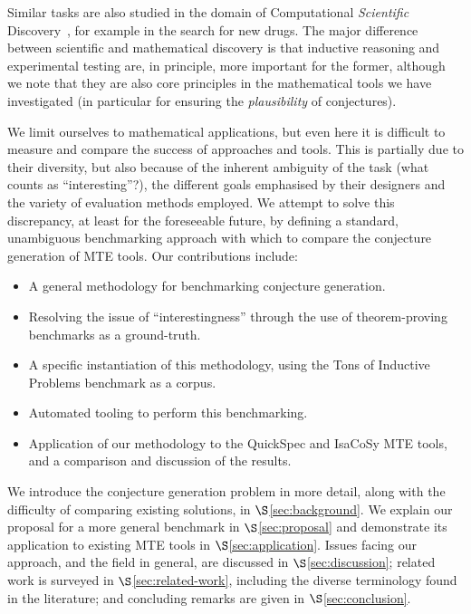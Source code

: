 Similar tasks are also studied in the domain of Computational \emph{Scientific}
Discovery~\cite{king2004functional,Williams20141289,schmidt2009distilling}, for
example in the search for new drugs. The major difference between scientific and
mathematical discovery is that inductive reasoning and experimental testing are,
in principle, more important for the former, although we note that they are also
core principles in the mathematical tools we have investigated (in particular
for ensuring the \emph{plausibility} of conjectures).

We limit ourselves to mathematical applications, but even here it is difficult
to measure and compare the success of approaches and tools. This is partially
due to their diversity, but also because of the inherent ambiguity of the task
(what counts as ``interesting''?), the different goals emphasised by their
designers and the variety of evaluation methods employed. We attempt to solve
this discrepancy, at least for the foreseeable future, by defining a standard,
unambiguous benchmarking approach with which to compare the conjecture
generation of MTE tools. Our contributions include:

\begin{itemize}
\item A general methodology for benchmarking conjecture generation.
\item Resolving the issue of ``interestingness'' through the use of
  theorem-proving benchmarks as a ground-truth.
\item A specific instantiation of this methodology, using the Tons of Inductive
  Problems benchmark as a corpus.
\item Automated tooling to perform this benchmarking.
\item Application of our methodology to the QuickSpec and IsaCoSy MTE tools,
  and a comparison and discussion of the results.
\end{itemize}

We introduce the conjecture generation problem in more detail, along with the
difficulty of comparing existing solutions, in $\S$\ref{sec:background}. We
explain our proposal for a more general benchmark in $\S$\ref{sec:proposal} and
demonstrate its application to existing MTE tools in $\S$\ref{sec:application}.
Issues facing our approach, and the field in general, are discussed in
$\S$\ref{sec:discussion}; related work is surveyed in
$\S$\ref{sec:related-work}, including the diverse terminology found in the
literature; and concluding remarks are given in $\S$\ref{sec:conclusion}.

